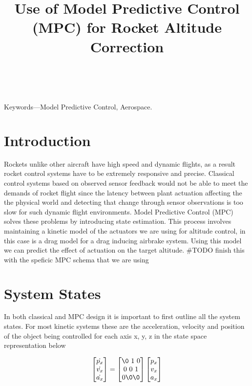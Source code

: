 \documentclass[conference, letterpaper]{IEEEtran}
\title{ Use of Model Predictive Control (MPC) for Rocket Altitude Correction }
\author{ \IEEEauthorblockN{Nikhil Peri, Anthony Lin, Manit Ginoya, Paul Buzuloiu } \
\IEEEauthorblockA{uOttawa Rocketry Team \\ \{nperi104, alin102
mgino015, pbuzu025\}@uottawa.ca} }
\begin{document}
\maketitle
\begin{abstract}
\end{abstract}

Keywords—Model Predictive Control, Aerospace.  \section{Introduction}

Rockets unlike other aircraft have high speed and dynamic flights, as a result
rocket control systems have to be extremely responsive and precise. Classical
control systems based on observed sensor feedback would not be able to meet the
demands of rocket flight since the latency between plant actuation affecting the
the physical world and detecting that change through sensor observations is too
slow for such dynamic flight environments. Model Predictive Control (MPC) solves
these problems by introducing state estimation.  This process involves maintaining
a kinetic model of the actuators we are using for altitude control, in this case
is a drag model for a drag inducing airbrake system. Using this model we can predict
the effect of actuation on the target altitude. #TODO finish this with the speficic MPC schema that we are using

\section{System States}
In both classical and MPC design it is important to first outline all the system states.
For most kinetic systems these are the acceleration, velocity and position of the object
being controlled for each axis x, y, z in the state space representation below

\begin{equation}
\begin{bmatrix}\dot{p_x}\\\dot{v_x}\\\dot{a_x}\end{bmatrix}=
\begin{bmatrix}\0 \ 1\ 0\\0 \ 0\ 1\\0\0\0\end{bmatrix}
\begin{bmatrix}p_x\\v_x\\a_x\end{bmatrix}
\end{equation}
\end{document}
